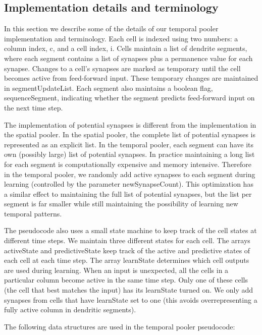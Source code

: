 \documentclass{report}
\begin{document}
\subsection*{Implementation details and terminology}
In this section we describe some of the details of our temporal pooler
implementation and terminology. Each cell is indexed using two
numbers: a column index, c, and a cell index, i. Cells maintain a list
of dendrite segments, where each segment contains a list of synapses
plus a permanence value for each synapse. Changes to a cell's synapses
are marked as temporary until the cell becomes active from
feed-forward input. These temporary changes are maintained in
segmentUpdateList. Each segment also maintains a boolean flag,
sequenceSegment, indicating whether the segment predicts feed-forward
input on the next time step.

The implementation of potential synapses is different from the
implementation in the spatial pooler. In the spatial pooler, the
complete list of potential synapses is represented as an explicit
list. In the temporal pooler, each segment can have its own (possibly
large) list of potential synapses. In practice maintaining a long list
for each segment is computationally expensive and memory
intensive. Therefore in the temporal pooler, we randomly add active
synapses to each segment during learning (controlled by the parameter
newSynapseCount). This optimization has a similar effect to
maintaining the full list of potential synapses, but the list per
segment is far smaller while still maintaining the possibility of
learning new temporal patterns.

The pseudocode also uses a small state machine to keep track of the
cell states at different time steps. We maintain three different
states for each cell. The arrays activeState and predictiveState keep
track of the active and predictive states of each cell at each time
step. The array learnState determines which cell outputs are used
during learning. When an input is unexpected, all the cells in a
particular column become active in the same time step. Only one of
these cells (the cell that best matches the input) has its learnState
turned on. We only add synapses from cells that have learnState set to
one (this avoids overrepresenting a fully active column in dendritic
segments).

The following data structures are used in the temporal pooler pseudocode:
\end{document}

